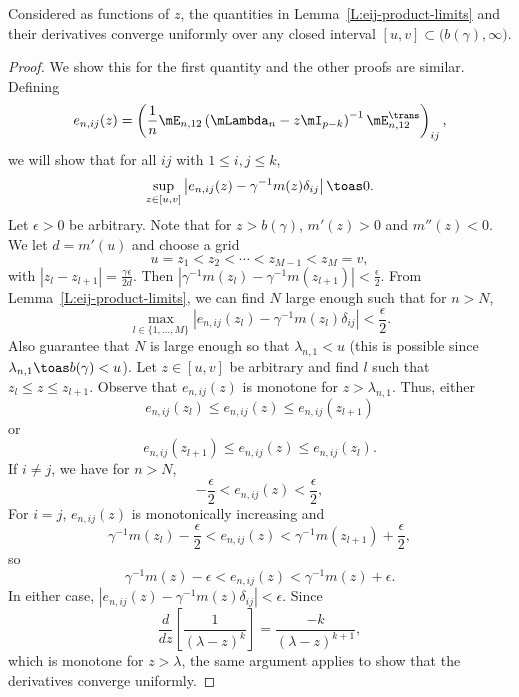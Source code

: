 \begin{lemma}\label{L:eij-product-limits-uniform}
    Considered as functions of $z$, the quantities in 
    Lemma~\ref{L:eij-product-limits} and their derivatives
    converge uniformly over any closed
    interval $[u,v] \subset \big( b(\gamma),\infty \big)$.
\end{lemma}
\begin{proof}
    We show this for the first quantity and the other proofs are similar.
    Defining
    \[
        e_{n,ij}(z)
        =
        \left(
            \frac{1}{n}
            \mE_{n,12}
            \left(
                \mLambda_n - z \mI_{p-k}
            \right)^{-1}
            \mE_{n,12}^\trans
        \right)_{ij},
    \]
    we will show that for all $ij$ with $1 \leq i,j \leq k$, 
    \[
        \sup_{z \in [u,v]} 
            \left|
                e_{n,ij}(z)
                    -
                    \gamma^{-1}
                    m(z)
                    \delta_{ij}
            \right|
            \toas 0.
    \]
    Let $\epsilon > 0$ be arbitrary.  Note that for 
    $z > b(\gamma)$, $m'(z) > 0$ and $m''(z) < 0$.  We let $d = m'(u)$ and
    choose a grid
    \[
        u = z_1 < z_2 < \cdots < z_{M-1} < z_M = v,
    \]
    with $|z_l - z_{l+1}| = \frac{\gamma \epsilon}{2 d}$.  
    Then $|\gamma^{-1} m(z_l) - \gamma^{-1} m(z_{l+1})| < \frac{\epsilon}{2}$.  
    From 
    Lemma~\ref{L:eij-product-limits}, we can find $N$ large enough such
    that for $n > N$, 
    \[
        \max_{l\in\{1, \ldots, M\}}
            \left|
                e_{n,ij}(z_l)
                    -
                    \gamma^{-1}
                    m(z_l)
                    \delta_{ij}
            \right|
            <
            \frac{\epsilon}{2}.
    \]
    Also guarantee that $N$ is large enough so that $\lambda_{n,1} < u$ 
    (this is possible since $\lambda_{n,1} \toas b(\gamma) < u$).
    Let $z \in [u,v]$ be arbitrary and find $l$ such that 
    $z_l \leq z \leq z_{l+1}$.
    Observe that $e_{n,ij}(z)$ is monotone for $z > \lambda_{n,1}$.  Thus,
    either
    \[
        e_{n,ij}(z_l) \leq e_{n,ij}(z) \leq e_{n,ij}(z_{l+1})
    \]
    or
    \[
        e_{n,ij}(z_{l+1}) \leq e_{n,ij}(z) \leq e_{n,ij}(z_{l}).
    \]
    If $i \neq j$, we have for $n > N$,
    \[
        -\frac{\epsilon}{2} < e_{n,ij}(z) < \frac{\epsilon}{2},
    \]
    For $i = j$, $e_{n,ij}(z)$ is 
    monotonically increasing and
    \[
        \gamma^{-1} m(z_l) - \frac{\epsilon}{2}
            <
                e_{n,ij}(z)
                    <
                        \gamma^{-1} m(z_{l+1}) + \frac{\epsilon}{2},
    \]
    so
    \[
        \gamma^{-1} m(z) - \epsilon
            <
                e_{n,ij}(z)
                    <
                        \gamma^{-1} m(z) + \epsilon.
    \]
    In either case, 
    $|e_{n,ij}(z) - \gamma^{-1} m(z) \delta_{ij}| < \epsilon$.
    Since 
    \[
        \frac{d}{dz} \left[
            \frac{1}{(\lambda - z)^k}
        \right]
            =
            \frac{-k}{(\lambda - z)^{k+1}},
    \]
    which is monotone for $z > \lambda$, the same argument applies to show
    that the derivatives converge uniformly.
\end{proof}

